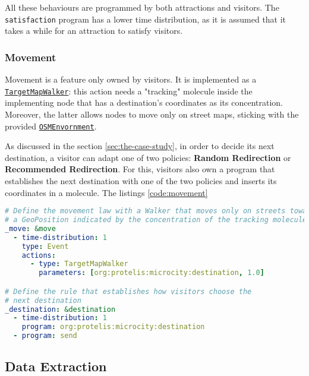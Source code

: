 \noindent
All these behaviours are programmed by both attractions and visitors.
The \texttt{satisfaction} program has a lower time distribution, as it is assumed that it takes a while for an attraction to satisfy visitors.

\subsubsection{Movement}
Movement is a feature only owned by visitors. It is implemented as a \href{https://alchemistsimulator.github.io/reference/kdoc/alchemist/it.unibo.alchemist.model.implementations.actions/-target-map-walker/index.html}{\texttt{TargetMapWalker}}: this action needs a "tracking" molecule inside the implementing node that has a destination's coordinates as its concentration.
Moreover, the latter allows nodes to move only on street maps, sticking with the provided \href{https://alchemistsimulator.github.io/reference/kdoc/alchemist/it.unibo.alchemist.model.implementations.environments/-o-s-m-environment/}{\texttt{OSMEnvornment}}.

As discussed in the section \ref{sec:the-case-study}, in order to decide its next destination, a visitor can adapt one of two policies: \textbf{Random Redirection} or \textbf{Recommended Redirection}. For this, visitors also own a program that establishes the next destination with one of the two policies and inserts its coordinates in a molecule. The listings \ref{code:movement}

\begin{lstlisting}[language=yaml, label=code:movement, caption=Define the movement behaviour for visitors.]
# Define the movement law with a Walker that moves only on streets towards
# a GeoPosition indicated by the concentration of the tracking molecule
_move: &move
  - time-distribution: 1
    type: Event
    actions:
      - type: TargetMapWalker
        parameters: [org:protelis:microcity:destination, 1.0]

# Define the rule that establishes how visitors choose the
# next destination
_destination: &destination
  - time-distribution: 1
    program: org:protelis:microcity:destination
  - program: send
\end{lstlisting}

\subsection{Data Extraction}